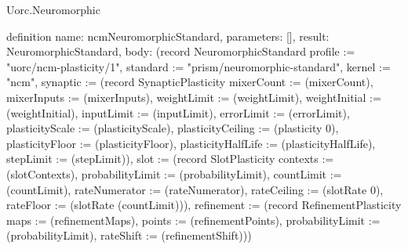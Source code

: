 \begin{lexlean}{Uorc.Neuromorphic}
\begin{semanticmodule}
definition{
  name: ncmNeuromorphicStandard,
  parameters: [],
  result: NeuromorphicStandard,
  body: (record NeuromorphicStandard {profile := "uorc/ncm-plasticity/1", standard := "prism/neuromorphic-standard", kernel := "ncm", synaptic := (record SynapticPlasticity {mixerCount := (mixerCount), mixerInputs := (mixerInputs), weightLimit := (weightLimit), weightInitial := (weightInitial), inputLimit := (inputLimit), errorLimit := (errorLimit), plasticityScale := (plasticityScale), plasticityCeiling := (plasticity 0), plasticityFloor := (plasticityFloor), plasticityHalfLife := (plasticityHalfLife), stepLimit := (stepLimit)}), slot := (record SlotPlasticity {contexts := (slotContexts), probabilityLimit := (probabilityLimit), countLimit := (countLimit), rateNumerator := (rateNumerator), rateCeiling := (slotRate 0), rateFloor := (slotRate (countLimit))}), refinement := (record RefinementPlasticity {maps := (refinementMaps), points := (refinementPoints), probabilityLimit := (probabilityLimit), rateShift := (refinementShift)})})
}
\end{semanticmodule}
\end{lexlean}
